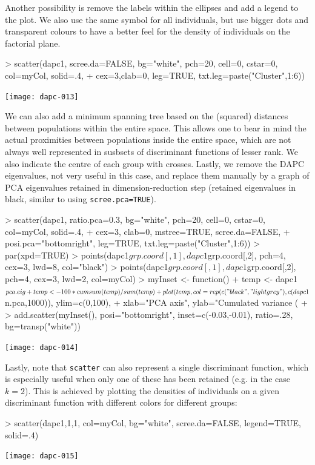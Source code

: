 \documentclass{article}
\begin{document}
\noindent Another possibility is remove the labels within the ellipses and add a legend to the
plot. We also use the same symbol for all individuals, but use bigger dots and transparent colours
to have a better feel for the density of individuals on the factorial plane.
\begin{Schunk}
\begin{Sinput}
> scatter(dapc1, scree.da=FALSE, bg="white", pch=20,  cell=0, cstar=0, col=myCol, solid=.4,
+         cex=3,clab=0, leg=TRUE, txt.leg=paste("Cluster",1:6))
\end{Sinput}
\end{Schunk}
\texttt{[image: dapc-013]}

We can also add a minimum spanning tree based on the (squared) distances between populations within the
entire space.
This allows one to bear in mind the actual proximities between populations inside the entire space, which are not always
well represented in susbsets of discriminant functions of lesser rank.
We also indicate the centre of each group with crosses.
Lastly, we remove the DAPC eigenvalues, not very useful in this case, and replace them manually by a graph of
PCA eigenvalues retained in dimension-reduction step (retained eigenvalues in black, similar to
using \texttt{scree.pca=TRUE}).
\begin{Schunk}
\begin{Sinput}
> scatter(dapc1, ratio.pca=0.3, bg="white", pch=20,  cell=0, cstar=0, col=myCol, solid=.4,
+         cex=3, clab=0, mstree=TRUE, scree.da=FALSE,
+         posi.pca="bottomright", leg=TRUE, txt.leg=paste("Cluster",1:6))
> par(xpd=TRUE)
> points(dapc1$grp.coord[,1], dapc1$grp.coord[,2], pch=4, cex=3, lwd=8, col="black")
> points(dapc1$grp.coord[,1], dapc1$grp.coord[,2], pch=4, cex=3, lwd=2, col=myCol)
> myInset <- function(){
+     temp <- dapc1$pca.eig
+     temp <- 100* cumsum(temp)/sum(temp)
+     plot(temp, col=rep(c("black","lightgrey"), c(dapc1$n.pca,1000)), ylim=c(0,100),
+          xlab="PCA axis", ylab="Cumulated variance (%
+ }
> add.scatter(myInset(), posi="bottomright", inset=c(-0.03,-0.01), ratio=.28, bg=transp("white"))
\end{Sinput}
\end{Schunk}
\texttt{[image: dapc-014]}


Lastly, note that \texttt{scatter} can also represent a single discriminant function, which is
especially useful when only one of these has been retained (e.g. in the case $k=2$).
This is achieved by plotting the densities of individuals on a given discriminant function with
different colors for different groups:
\begin{Schunk}
\begin{Sinput}
> scatter(dapc1,1,1, col=myCol, bg="white", scree.da=FALSE, legend=TRUE, solid=.4)
\end{Sinput}
\end{Schunk}
\texttt{[image: dapc-015]}
\end{document}
